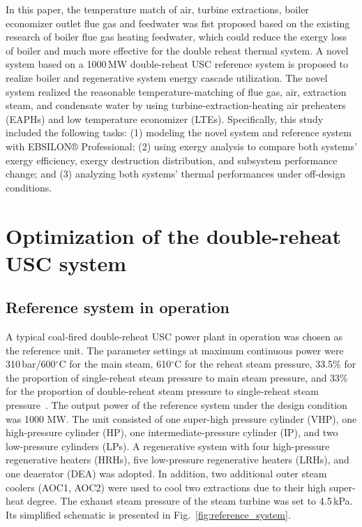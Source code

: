\documentclass[preprint,12pt]{elsarticle}
\begin{document}
In this paper, the temperature match of air, turbine extractions, boiler economizer outlet flue gas and feedwater was fist proposed based on the existing research of boiler flue gas heating feedwater, which could reduce the exergy loss of boiler and much more effective for the double reheat thermal system.
A novel system based on a 1000\,MW double-reheat USC reference system is proposed to realize boiler and regenerative system energy cascade utilization. 
The novel system realized the reasonable temperature-matching of flue gas, air, extraction steam, and condensate water by using turbine-extraction-heating air preheaters (EAPHs) and low temperature economizer (LTEs).
Specifically, this study included the following tasks: (1) modeling the novel system and reference system with EBSILON® Professional; (2) using exergy analysis to compare both systems' exergy efficiency, exergy destruction distribution, and subsystem performance change; and (3) analyzing both systems' thermal performances under off-design conditions.



\section{Optimization of the double-reheat USC system}
\label{sec2:system intro}
\subsection{Reference system in operation}
\label{sub2:ref intro}
A typical coal-fired double-reheat USC power plant in operation was chosen as the reference unit.
The parameter settings at maximum continuous power were 310\,bar/600$^\circ$C for the main steam, 610$^\circ$C for the reheat steam pressure, 33.5\% for the proportion of single-reheat steam pressure to main steam pressure, and 33\% for the proportion of double-reheat steam pressure to single-reheat steam pressure~\cite{Zhao2017Exergy}.
The output power of the reference system under the design condition was 1000 MW.
The unit consisted of one super-high pressure cylinder (VHP), one high-pressure cylinder (HP), one intermediate-pressure cylinder (IP), and two low-pressure cylinders (LPs).
A regenerative system with four high-pressure regenerative heaters (HRHs), five low-pressure regenerative heaters (LRHs), and one deaerator (DEA) was adopted.
In addition, two additional outer steam coolers (AOC1, AOC2) were used to cool two extractions due to their high super-heat degree. The exhaust steam pressure of the steam turbine was set to 4.5\,kPa. Its simplified schematic is presented in Fig.~\ref{fig:reference_system}.
\end{document}
